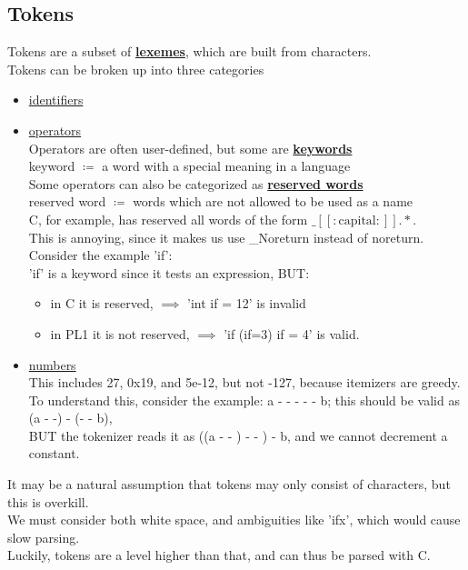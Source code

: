 \documentclass[../../lecture_notes.tex]{subfiles}
\begin{document}
\subsection*{Tokens}
Tokens are a subset of \textbf{\underline{lexemes}}, which are built from characters.\\
Tokens can be broken up into three categories \begin{itemize}[itemsep=0mm]
	\item \underline{identifiers} 
	\item \underline{operators} \\
		Operators are often user-defined, but some are \textbf{\underline{keywords}}\\
		\indent keyword $\coloneqq$ a word with a special meaning in a language\\
		Some operators can also be categorized as \textbf{\underline{reserved words}}\\
		\indent reserved word $\coloneqq$ words which are not allowed to be used as a name\\
		C, for example, has reserved all words of the form $\_[[:\mbox{capital}:]].*$.\\
		This is annoying, since it makes us use \_Noreturn instead of noreturn.\\
		Consider the example 'if':\\
			'if' is a keyword since it tests an expression, BUT: \begin{itemize}[itemsep=0mm]
			\item in C it is reserved, $\implies$ 'int if = 12' is invalid\\
			\item in PL1 it is not reserved, $\implies$ 'if (if=3) if = 4' is valid.
			\end{itemize}
	\item \underline{numbers} \\
		This includes 27, 0x19, and 5e-12, but not -127, because itemizers are greedy.\\
		To understand this, consider the example: a - - - - - b; this should be valid as (a - -) - (- - b), 
		\\ BUT the tokenizer reads it as ((a - - ) - - ) - b, and we cannot decrement a constant.
\end{itemize}
It may be a natural assumption that tokens may only consist of characters, but this is overkill.\\
We must consider both white space, and ambiguities like 'ifx', which would cause slow parsing.\\
Luckily, tokens are a level higher than that, and can thus be parsed with C.
\end{document}
